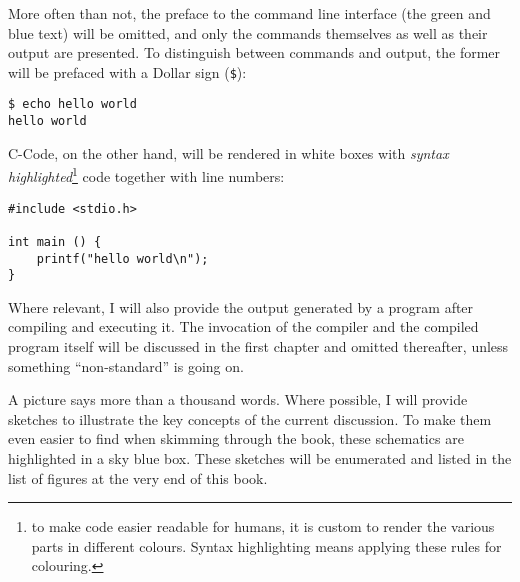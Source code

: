 More often than not, the preface to the command line interface (the green and blue text) will be omitted, and only the commands themselves as well as their output are presented. To distinguish between commands and output, the former will be prefaced with a Dollar sign (\texttt{\$}):

\begin{cmdbox}
\texttt{\$ echo hello world} \\
\texttt{hello world}
\end{cmdbox}

C-Code, on the other hand, will be rendered in white boxes with \emph{syntax highlighted}\footnote{to make code easier readable for humans, it is custom to render the various parts in different colours. Syntax highlighting means applying these rules for colouring.} code together with line numbers:
\begin{codebox}[helloworld.c]
\begin{verbatim}
#include <stdio.h>

int main () {
    printf("hello world\n");
}
\end{verbatim}
\end{codebox}

Where relevant, I will also provide the output generated by a program after compiling and executing it. The invocation of the compiler and the compiled program itself will be discussed in the first chapter and omitted thereafter, unless something \enquote{non-standard} is going on.

A picture says more than a thousand words. Where possible, I will provide sketches to illustrate the key concepts of the current discussion. To make them even easier to find when skimming through the book, these schematics are highlighted in a sky blue box. These sketches will be enumerated and listed in the list of figures at the very end of this book.

\begin{defbox}[Success]
\begin{center}
\end{center}
\end{defbox}

